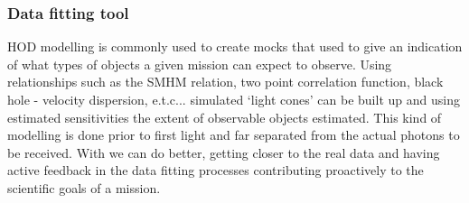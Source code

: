 \subsubsection{Data fitting tool}

HOD modelling is commonly used to create mocks that used to give an indication of what types of objects a given mission can expect to observe. Using relationships such as the SMHM relation, two point correlation function, black hole - velocity dispersion, e.t.c... simulated `light cones' can be built up and using estimated sensitivities the extent of observable objects estimated. This kind of modelling is done prior to first light and far separated from the actual photons to be received. With \steel we can do better, getting closer to the real data and having active feedback in the data fitting processes contributing proactively to the scientific goals of a mission. 

